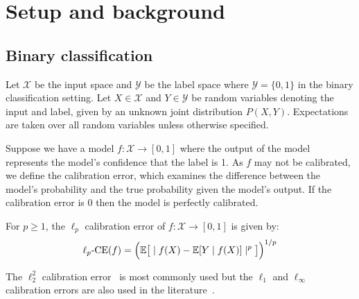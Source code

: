 \section{Setup and background}
\label{sec:formulation}

\newcommand{\lpce}[0]{\ensuremath{\ell_p\mbox{-CE}}}
\newcommand{\ltwoce}[0]{\ensuremath{\ell_2\mbox{-CE}}}
\newcommand{\squaredce}[0]{\ensuremath{\ell_2^2\mbox{-CE}}}
\newcommand{\topsquaredce}[0]{\ensuremath{\ell_2^2\mbox{-TCE}}}
\newcommand{\margsquaredce}[0]{\ensuremath{\ell_2^2\mbox{-MCE}}}

\subsection{Binary classification}

Let $\mathcal{X}$ be the input space and $\mathcal{Y}$ be the label space where $\mathcal{Y} = \{0, 1\}$ in the binary classification setting.
Let $X \in \mathcal{X}$ and $Y \in \mathcal{Y}$ be random variables denoting the input and label, given by an unknown joint distribution $P(X, Y)$. Expectations are taken over all random variables unless otherwise specified.

Suppose we have a model $f : \mathcal{X} \to [0, 1]$ where the output of the model represents the model's confidence that the label is 1. As $f$ may not be calibrated, we define the calibration error, which examines the difference between the model's probability and the true probability given the model's output. If the calibration error is $0$ then the model is perfectly calibrated.

\begin{definition}
For $p \geq 1$, the $\ell_p$ calibration error of $f : \mathcal{X} \to [0, 1]$ is given by:
\begin{align}
\lpce(f) = \Big(\expect\big[ \mid f(X) - \expect[Y \; | \; f(X)] \mid^p \big] \Big)^{1/p}
\end{align}
\end{definition}

The $\ell_2^2$ calibration error~\cite{murphy1973vector,murphy1977reliability,degroot1983forecasters, nguyen2015posterior, hendrycks2019anomaly, kuleshov2015calibrated, hendrycks2019pretraining, brocker2012empirical} is most commonly used but the $\ell_1$ and $\ell_{\infty}$ calibration errors are also used in the literature~\cite{guo2017calibration, naeini2015obtaining, nixon2019calibration}.


